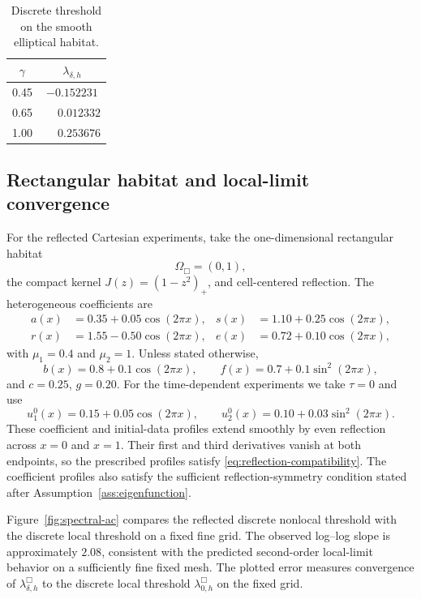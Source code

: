 \documentclass[11pt]{article}
\theoremstyle{definition}
\begin{document}
\begin{table}[htbp]
\centering
\caption{Discrete threshold on the smooth elliptical habitat.}
\label{tab:ellipse-threshold}
\begin{tabular}{cc}
\toprule
$\gamma$ & $\lambda_{\delta,h}$\\
\midrule
0.45 & $-0.152231$\\
0.65 & $\phantom{-}0.012332$\\
1.00 & $\phantom{-}0.253676$\\
\bottomrule
\end{tabular}
\end{table}

\subsection{Rectangular habitat and local-limit convergence}

For the reflected Cartesian experiments, take the one-dimensional rectangular habitat
\[
 \Omega_{\Box}=(0,1),
\]
the compact kernel $J(z)=(1-z^2)_+$, and cell-centered reflection.  The heterogeneous coefficients are
\[
\begin{aligned}
 a(x)&=0.35+0.05\cos(2\pi x),
 &s(x)&=1.10+0.25\cos(2\pi x),\\
 r(x)&=1.55-0.50\cos(2\pi x),
 &e(x)&=0.72+0.10\cos(2\pi x),
\end{aligned}
\]
with $\mu_1=0.4$ and $\mu_2=1$.  Unless stated otherwise,
\[
 b(x)=0.8+0.1\cos(2\pi x),\qquad
 f(x)=0.7+0.1\sin^2(2\pi x),
\]
and $c=0.25$, $g=0.20$.  For the time-dependent experiments we take $\tau=0$ and use
\[
 u_1^0(x)=0.15+0.05\cos(2\pi x),\qquad
 u_2^0(x)=0.10+0.03\sin^2(2\pi x).
\]
These coefficient and initial-data profiles extend smoothly by even reflection
across $x=0$ and $x=1$.  Their first and third derivatives vanish at both
endpoints, so the prescribed profiles satisfy
\eqref{eq:reflection-compatibility}.  The coefficient profiles also satisfy
the sufficient reflection-symmetry condition stated after
Assumption~\ref{ass:eigenfunction}.

Figure~\ref{fig:spectral-ac} compares the reflected discrete nonlocal threshold with the discrete local threshold on a fixed fine grid.  The observed log--log slope is approximately $2.08$, consistent with the predicted second-order local-limit behavior on a sufficiently fine fixed mesh.  The plotted error measures convergence of $\lambda_{\delta,h}^{\Box}$ to the discrete local threshold $\lambda_{0,h}^{\Box}$ on the fixed grid.
\end{document}
